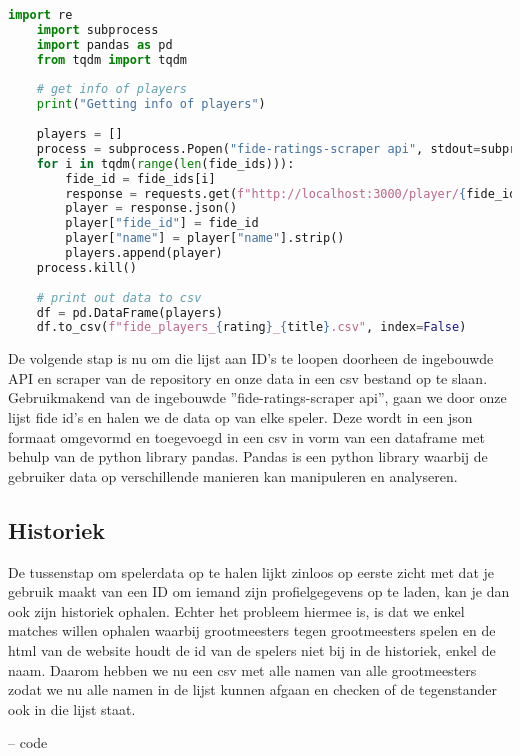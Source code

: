 \begin{lstlisting}[language=Python]
    import re
    import subprocess
    import pandas as pd
    from tqdm import tqdm
    
    # get info of players
    print("Getting info of players")
    
    players = []
    process = subprocess.Popen("fide-ratings-scraper api", stdout=subprocess.PIPE, stderr=subprocess.PIPE, shell=True)
    for i in tqdm(range(len(fide_ids))):
        fide_id = fide_ids[i]
        response = requests.get(f"http://localhost:3000/player/{fide_id}/info")
        player = response.json()
        player["fide_id"] = fide_id
        player["name"] = player["name"].strip()
        players.append(player)
    process.kill()
    
    # print out data to csv
    df = pd.DataFrame(players)
    df.to_csv(f"fide_players_{rating}_{title}.csv", index=False)
\end{lstlisting}

De volgende stap is nu om die lijst aan ID's te loopen doorheen de ingebouwde API en scraper van de repository en onze data in een csv bestand op te slaan. Gebruikmakend van de ingebouwde ''fide-ratings-scraper api'', gaan we door onze lijst fide id's en halen we de data op van elke speler. Deze wordt in een json formaat omgevormd en toegevoegd in een csv in vorm van een dataframe met behulp van de python library pandas. Pandas is een python library waarbij de gebruiker data op verschillende manieren kan manipuleren en analyseren.\autocite{NumFocus}

\subsection{Historiek}

De tussenstap om spelerdata op te halen lijkt zinloos op eerste zicht met dat je gebruik maakt van een ID om iemand zijn profielgegevens op te laden, kan je dan ook zijn historiek ophalen. Echter het probleem hiermee is, is dat we enkel matches willen ophalen waarbij grootmeesters tegen grootmeesters spelen en de html van de website houdt de id van de spelers niet bij in de historiek, enkel de naam. Daarom hebben we nu een csv met alle namen van alle grootmeesters zodat we nu alle namen in de lijst kunnen afgaan en checken of de tegenstander ook in die lijst staat. 

-- code